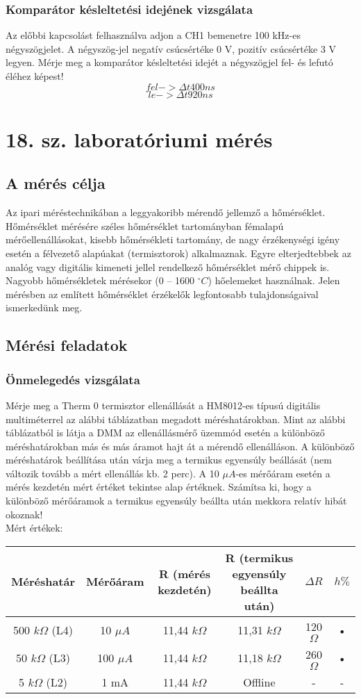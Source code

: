\documentclass[10pt,a4paper]{article}
\begin{document}
\subsubsection{Komparátor késleltetési idejének vizsgálata}
	Az előbbi kapcsolást felhasználva adjon a CH1 bemenetre 100 kHz-es
négyszögjelet. A négyszög-jel negatív csúcsértéke 0 V, pozitív csúcsértéke 3
V legyen.
Mérje meg a komparátor késleltetési idejét a négyszögjel fel- és lefutó éléhez
képest! $$fel -> \Delta t 400 ns$$
		$$le -> \Delta t 920 ns$$
	\section{18. sz. laboratóriumi mérés}
	\subsection{A mérés célja}
	Az ipari méréstechnikában a leggyakoribb mérendő jellemző a
hőmérséklet.
Hőmérséklet mérésére széles hőmérséklet tartományban
fémalapú mérőellenállásokat, kisebb hőmérsékleti tartomány, de
nagy érzékenységi igény esetén a félvezető alapúakat
(termisztorok) alkalmaznak. Egyre elterjedtebbek az analóg vagy
digitális kimeneti jellel rendelkező hőmérséklet mérő chippek is.
Nagyobb hőmérsékletek mérésekor (0 – 1600 $^{\circ}C$) hőelemeket
használnak. Jelen mérésben az említett hőmérséklet érzékelők legfontosabb
tulajdonságaival ismerkedünk meg.
	\subsection{Mérési feladatok}
\subsubsection{Önmelegedés vizsgálata}
Mérje meg a Therm 0 termisztor ellenállását a HM8012-es típusú
digitális multiméterrel az alábbi táblázatban megadott
méréshatárokban.
Mint az alábbi táblázatból is látja a DMM az ellenállásmérő
üzemmód esetén a különböző méréshatárokban más és más
áramot hajt át a mérendő ellenálláson.
A különböző méréshatárok beállítása után várja meg a termikus
egyensúly beállását (nem változik tovább a mért ellenállás kb. 2
perc). A 10 $\mu A$-es mérőáram esetén a mérés kezdetén mért értéket
tekintse alap értéknek. Számítsa ki, hogy a különböző mérőáramok a termikus egyensúly
beállta után mekkora relatív hibát okoznak!$$$$Mért értékek:$$$$\begin{tabular}{|c|c|c|c|c|c|}
\hline 
Méréshatár & Mérőáram & R (mérés kezdetén) & R (termikus egyensúly beállta után) & $\Delta R$ & $h \%$ \\ 
\hline 
500 $k\Omega$ (L4) & 10 $\mu A$ & 11,44 $k\Omega$ & 11,31 $k\Omega$ & 120 $\Omega$ & • \\ 
\hline 
50 $k\Omega$ (L3) & 100 $\mu A$ & 11,44 $k\Omega$ & 11,18 $k\Omega$ & 260 $\Omega$ & • \\ 
\hline 
5 $k\Omega$ (L2) & 1 mA & 11,44 $k\Omega$ & Offline & - & - \\ 
\hline 
\end{tabular} 
\end{document}
